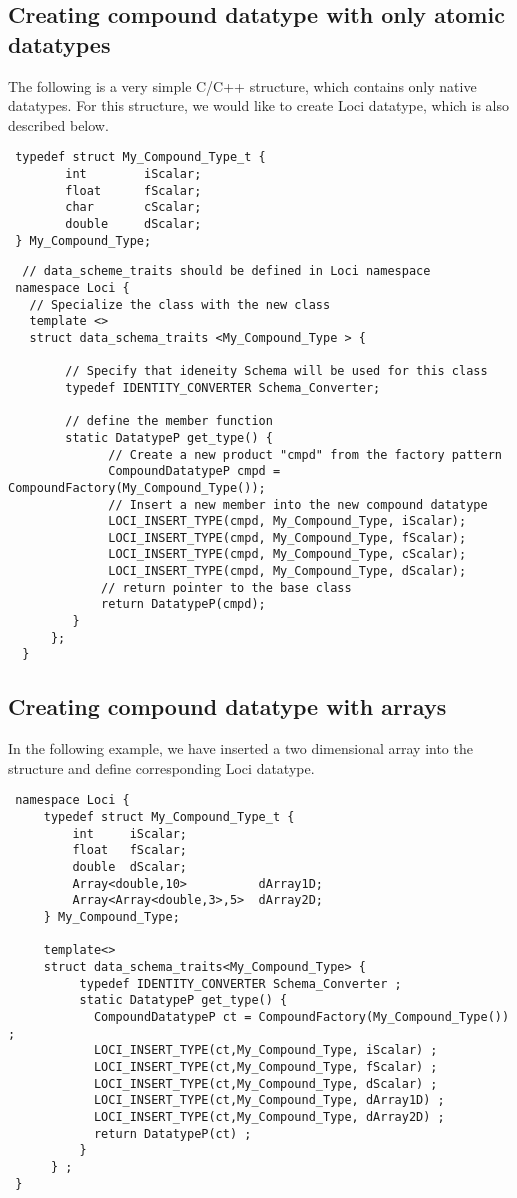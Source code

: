 \subsection {Creating compound datatype with only atomic datatypes}
The following is a very simple C/C++ structure, which contains only native datatypes.
For this structure, we would like to create Loci datatype, which is also described
below.
\begin{verbatim}
 typedef struct My_Compound_Type_t {
        int        iScalar;
        float      fScalar;
        char       cScalar;
        double     dScalar;
 } My_Compound_Type;
\end{verbatim}
\begin{verbatim}
  // data_scheme_traits should be defined in Loci namespace
 namespace Loci {
   // Specialize the class with the new class
   template <> 
   struct data_schema_traits <My_Compound_Type > {

        // Specify that ideneity Schema will be used for this class
        typedef IDENTITY_CONVERTER Schema_Converter;

        // define the member function
        static DatatypeP get_type() {
              // Create a new product "cmpd" from the factory pattern 
              CompoundDatatypeP cmpd = CompoundFactory(My_Compound_Type());
              // Insert a new member into the new compound datatype
              LOCI_INSERT_TYPE(cmpd, My_Compound_Type, iScalar);
              LOCI_INSERT_TYPE(cmpd, My_Compound_Type, fScalar);
              LOCI_INSERT_TYPE(cmpd, My_Compound_Type, cScalar);
              LOCI_INSERT_TYPE(cmpd, My_Compound_Type, dScalar);
             // return pointer to the base class
             return DatatypeP(cmpd);
         }
      };
  }
\end{verbatim}
\subsection{Creating compound datatype with arrays}
In the following example, we have inserted a two dimensional array
into the structure and define corresponding Loci datatype.
\begin{verbatim}
 namespace Loci {
     typedef struct My_Compound_Type_t {
         int     iScalar;
         float   fScalar;
         double  dScalar;
         Array<double,10>          dArray1D;
         Array<Array<double,3>,5>  dArray2D;
     } My_Compound_Type;
    
     template<>
     struct data_schema_traits<My_Compound_Type> {
          typedef IDENTITY_CONVERTER Schema_Converter ;
          static DatatypeP get_type() {
            CompoundDatatypeP ct = CompoundFactory(My_Compound_Type()) ;
            LOCI_INSERT_TYPE(ct,My_Compound_Type, iScalar) ;
            LOCI_INSERT_TYPE(ct,My_Compound_Type, fScalar) ;
            LOCI_INSERT_TYPE(ct,My_Compound_Type, dScalar) ;
            LOCI_INSERT_TYPE(ct,My_Compound_Type, dArray1D) ;
            LOCI_INSERT_TYPE(ct,My_Compound_Type, dArray2D) ;
            return DatatypeP(ct) ;
          }
      } ;
 }
\end{verbatim}
